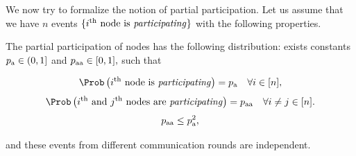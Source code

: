 \documentclass{article}
\newcommand*{\probavailable}{\ensuremath{p_{\textnormal{a}}}}
\newcommand*{\probpairaa}{\ensuremath{p_{\textnormal{aa}}}}
\begin{document}
We now try to formalize the notion of partial participation. Let us assume that we have $n$ events $\{i^{\textnormal{th}} \textnormal{ node is \textit{participating}}\}$ with the following properties.
\begin{assumption}
  \label{ass:partial_participation}
  The partial participation of nodes has the following distribution: exists constants $\probavailable \in (0, 1]$ and $\probpairaa \in [0, 1],$ such that
  \begin{enumerate}
    \Item \begin{align*}\Prob\left(i^{\textnormal{th}} \textnormal{ node is \textit{participating}}\right) = \probavailable \quad \forall i \in [n],\end{align*}
    \Item \begin{align*}\Prob\left(i^{\textnormal{th}} \textnormal{ and } j^{\textnormal{th}} \textnormal{ nodes are \textit{participating}}\right) = \probpairaa \quad \forall i \neq j \in [n].\end{align*}
    \Item \begin{align} \label{eq:partial_participation_constraint}
      \probpairaa \leq \probavailable^2,
    \end{align}
  \end{enumerate}
  and these events from different communication rounds are independent.
\end{assumption}
\end{document}
